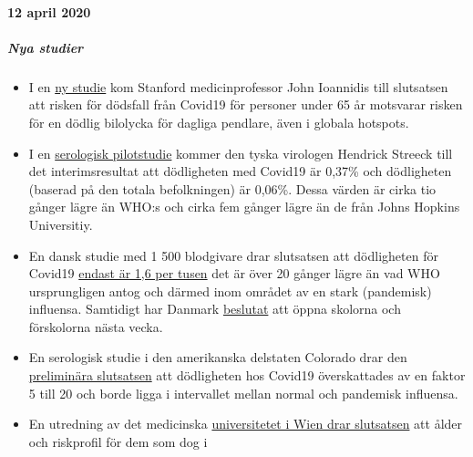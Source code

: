 \hypertarget{12-april-2020}{%
\paragraph{12 april 2020}\label{12-april-2020}}

\hypertarget{nya-studier}{%
\subparagraph{\texorpdfstring{\textbf{Nya
studier}}{Nya studier}}\label{nya-studier}}

\begin{itemize}
\tightlist
\item
  I en
  \href{https://www.medrxiv.org/content/10.1101/2020.04.05.20054361v1}{ny
  studie} kom Stanford medicinprofessor John Ioannidis till slutsatsen
  att risken för dödsfall från Covid19 för personer under 65 år
  motsvarar risken för en dödlig bilolycka för dagliga pendlare, även i
  globala hotspots.
\item
  I en
  \href{https://www.t-online.de/gesundheit/krankheiten-symptome/id_87680236/lockerung-der-corona-massnahmen-ergebnisse-der-heinsberg-studie-machen-hoffnung.html}{serologisk
  pilotstudie} kommer den tyska virologen Hendrick Streeck till det
  interimsresultat att dödligheten med Covid19 är 0,37\% och dödligheten
  (baserad på den totala befolkningen) är 0,06\%. Dessa värden är cirka
  tio gånger lägre än WHO:s och cirka fem gånger lägre än de från Johns
  Hopkins Universitiy.
\item
  En dansk studie med 1 500 blodgivare drar slutsatsen att dödligheten
  för Covid19
  \href{https://www.dr.dk/nyheder/indland/doedelighed-skal-formentlig-taelles-i-promiller-danske-blodproever-kaster-nyt-lys}{endast
  är 1,6 per tusen} det är över 20 gånger lägre än vad WHO ursprungligen
  antog och därmed inom området av en stark (pandemisk) influensa.
  Samtidigt har Danmark
  \href{https://www.thelocal.dk/20200406/denmark-to-reopen-schools-and-kindergartens-next-week}{beslutat}
  att öppna skolorna och förskolorna nästa vecka.
\item
  En serologisk studie i den amerikanska delstaten Colorado drar den
  \href{https://reason.com/2020/04/08/mass-antibody-testing-in-this-rural-colorado-county-sheds-light-on-covid-19s-prevalence-and-lethality/}{preliminära
  slutsatsen} att dödligheten hos Covid19 överskattades av en faktor 5
  till 20 och borde ligga i intervallet mellan normal och pandemisk
  influensa.
\item
  En utredning av det medicinska
  \href{https://www.vienna.at/analyse-zeigt-covid-19-opferkurve-entspricht-normaler-mortalitaet/6581246}{universitetet
  i Wien drar slutsatsen} att ålder och riskprofil för dem som dog i

\end{itemize}
